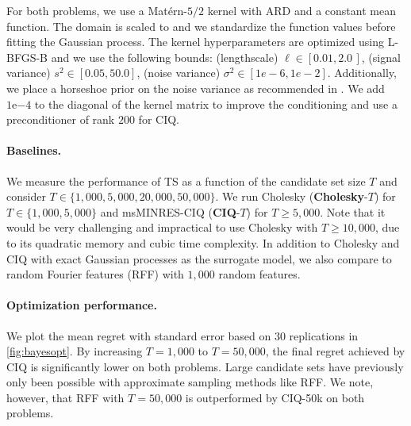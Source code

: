 For both problems, we use a Mat\'ern-$5/2$ kernel with ARD and a constant mean function.
The domain is scaled to  and we standardize the function values before fitting the Gaussian process.
The kernel hyperparameters are optimized using L-BFGS-B and we use the following bounds: (lengthscale) $\ell \in [0.01, 2.0\,]$, (signal variance) $s^2 \in [0.05, 50.0]$, (noise variance) $\sigma^2 \in [1e-6, 1e-2]$.
Additionally, we place a horseshoe prior on the noise variance as recommended in \cite{snoek2012practical}.
We add $1\mathrm{e}{-4}$ to the diagonal of the kernel matrix to improve the conditioning and use a preconditioner of rank $200$ for CIQ.


\paragraph{Baselines.}
We measure the performance of TS as a function of the candidate set size $T$ and consider $T \in \{ 1,\!000, 5,\!000, 20,\!000, 50,\!000 \}$.
We run Cholesky ({\bf Cholesky}-$T$) for  $T \in \{ 1,\!000, 5,\!000\}$ and msMINRES-CIQ ({\bf CIQ}-$T$) for $T \ge 5,\!000$.
Note that it would be very challenging and impractical to use Cholesky with $T \geq 10,\!000$, due to its quadratic memory and cubic time complexity.
In addition to Cholesky and CIQ with exact Gaussian processes as the surrogate model, we also compare to random Fourier features (RFF) \cite{rahimi2008random} with $1,\!000$ random features.

\paragraph{Optimization performance.}
We plot the mean regret with standard error based on 30 replications in \cref{fig:bayesopt}.
By increasing $T=1,\!000$ to $T=50,\!000$, the final regret achieved by CIQ is significantly lower on both problems.
Large candidate sets have previously only been possible with approximate sampling methods like RFF.
We note, however, that RFF with $T=50,\!000$ is outperformed by CIQ-50k on both problems.
